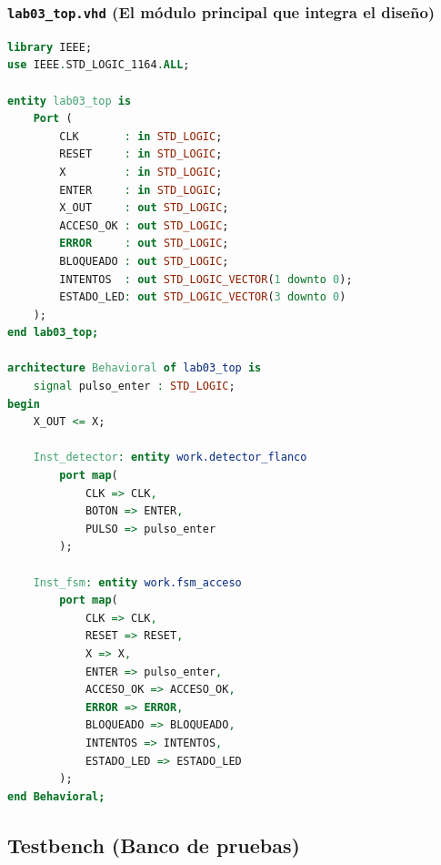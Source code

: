 \documentclass[letterpaper,12pt]{article}
\begin{document}
\subsubsection{\texttt{lab03\_top.vhd} (El módulo principal que integra el diseño)}
\begin{lstlisting}[language=VHDL, caption={lab03\_top.vhd}]
library IEEE;
use IEEE.STD_LOGIC_1164.ALL;

entity lab03_top is
    Port (
        CLK       : in STD_LOGIC;
        RESET     : in STD_LOGIC;
        X         : in STD_LOGIC;
        ENTER     : in STD_LOGIC;
        X_OUT     : out STD_LOGIC;
        ACCESO_OK : out STD_LOGIC;
        ERROR     : out STD_LOGIC;
        BLOQUEADO : out STD_LOGIC;
        INTENTOS  : out STD_LOGIC_VECTOR(1 downto 0);
        ESTADO_LED: out STD_LOGIC_VECTOR(3 downto 0)
    );
end lab03_top;

architecture Behavioral of lab03_top is
    signal pulso_enter : STD_LOGIC;
begin
    X_OUT <= X;

    Inst_detector: entity work.detector_flanco
        port map(
            CLK => CLK,
            BOTON => ENTER,
            PULSO => pulso_enter
        );

    Inst_fsm: entity work.fsm_acceso
        port map(
            CLK => CLK,
            RESET => RESET,
            X => X,
            ENTER => pulso_enter,
            ACCESO_OK => ACCESO_OK,
            ERROR => ERROR,
            BLOQUEADO => BLOQUEADO,
            INTENTOS => INTENTOS,
            ESTADO_LED => ESTADO_LED
        );
end Behavioral;
\end{lstlisting}

\subsection{Testbench (Banco de pruebas)}
\end{document}
